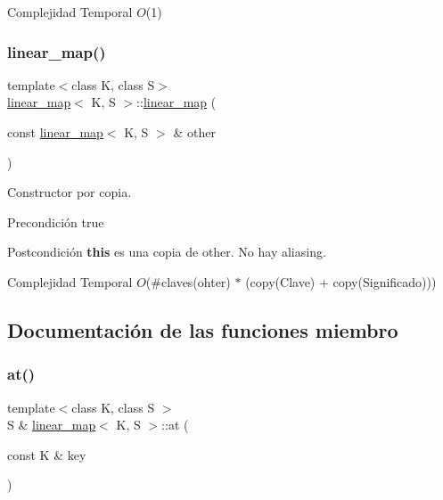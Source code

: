 \begin{DoxyDescription}
\item[Complejidad Temporal]$O$(1)
\end{DoxyDescription}\mbox{\label{classlinear__map_a29a92ea4bf65d4f5936b061ebb8309fa}} 
\subsubsection{\texorpdfstring{linear\+\_\+map()}{linear\_map()}\hspace{0.1cm}{\footnotesize\ttfamily [2/2]}}
{\footnotesize\ttfamily template$<$class K, class S$>$ \\
\mbox{\hyperlink{classlinear__map}{linear\+\_\+map}}$<$ K, S $>$\+::\mbox{\hyperlink{classlinear__map}{linear\+\_\+map}} (\begin{DoxyParamCaption}\item[{const \mbox{\hyperlink{classlinear__map}{linear\+\_\+map}}$<$ K, S $>$ \&}]{other }\end{DoxyParamCaption})}



Constructor por copia. 

\begin{DoxyPrecond}{Precondición}
true 
\end{DoxyPrecond}
\begin{DoxyPostcond}{Postcondición}
{\bfseries this} es una copia de other. No hay aliasing.
\end{DoxyPostcond}

\begin{DoxyDescription}
\item[Complejidad Temporal]$O$(\#claves(ohter) $\ast$ (copy(\+Clave) + copy(\+Significado)))
\end{DoxyDescription}

\subsection{Documentación de las funciones miembro}
\mbox{\label{classlinear__map_ad528c5b74bb14cfe7170bffffce2e979}} 
\subsubsection{\texorpdfstring{at()}{at()}\hspace{0.1cm}{\footnotesize\ttfamily [1/2]}}
{\footnotesize\ttfamily template$<$class K, class S $>$ \\
S \& \mbox{\hyperlink{classlinear__map}{linear\+\_\+map}}$<$ K, S $>$\+::at (\begin{DoxyParamCaption}\item[{const K \&}]{key }\end{DoxyParamCaption})}



